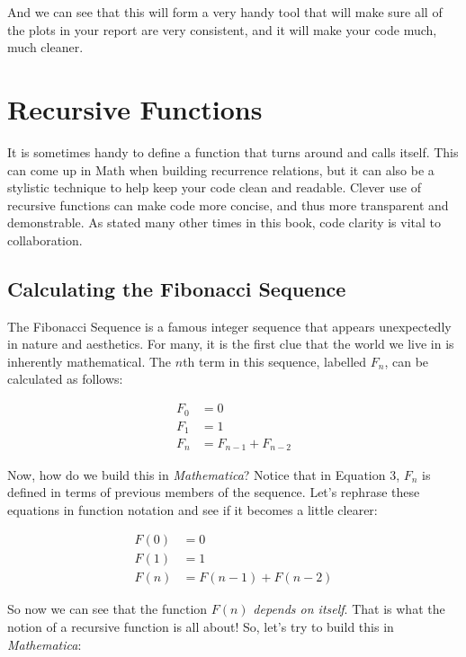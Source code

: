 And we can see that this will form a very handy tool that will make sure all of the plots in your report are very consistent, and it will make your code much, much cleaner.

\section{Recursive Functions}

It is sometimes handy to define a function that turns around and calls itself. This can come up in Math when building recurrence relations, but it can also be a stylistic technique to help keep your code clean and readable. Clever use of recursive functions can make code more concise, and thus more transparent and demonstrable. As stated many other times in this book, code clarity is vital to collaboration.

\subsection{Calculating the Fibonacci Sequence} 

The Fibonacci Sequence is a famous integer sequence that appears unexpectedly in nature and aesthetics. For many, it is the first clue that the world we live in is inherently mathematical. The $n$th term in this sequence, labelled $F_n$, can be calculated as follows:

\begin{align} 
	   F_0 &= 0 \\
	   F_1 &= 1 \\
	   F_n &= F_{n - 1} + F_{n - 2}
\end{align}

Now, how do we build this in \emph{Mathematica}? Notice that in Equation 3, $F_n$ is defined in terms of previous members of the sequence. Let's rephrase these equations in function notation and see if it becomes a little clearer:

\begin{align} 
	   F(0) &= 0 \\
	   F(1) &= 1 \\
	   F(n) &= F(n - 1) + F(n - 2)
\end{align}

So now we can see that the function $F(n)$ \emph{depends on itself}. That is what the notion of a recursive function is all about! So, let's try to build this in \emph{Mathematica}:

